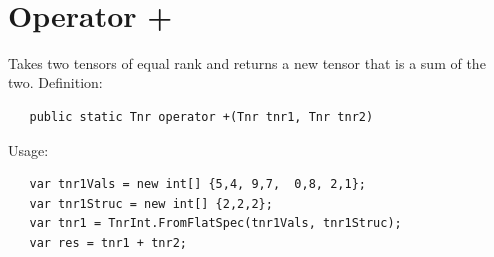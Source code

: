 

\cfoot{\thepage}								      %
\renewcommand{\headrulewidth}{0.0cm}			%
\renewcommand{\footrulewidth}{0.0cm}			%
\lstset{language=[Sharp]C,basicstyle=\small\sffamily}



\begin{center}
   \textbf{\LARGE{}}\\[0.25cm]
\end{center}

\section{Operator +}

Takes two tensors of equal rank and returns a new tensor that is a sum of the two. Definition:
\begin{lstlisting}
   public static Tnr operator +(Tnr tnr1, Tnr tnr2)
\end{lstlisting}
Usage:
\begin{lstlisting}
   var tnr1Vals = new int[] {5,4, 9,7,  0,8, 2,1};
   var tnr1Struc = new int[] {2,2,2};
   var tnr1 = TnrInt.FromFlatSpec(tnr1Vals, tnr1Struc);
   var res = tnr1 + tnr2;
\end{lstlisting}

